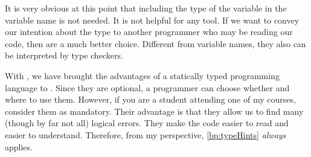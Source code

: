 It is very obvious at this point that including the type of the variable in the variable name is not needed.
It is not helpful for any tool.
If we want to convey our intention about the type to another programmer who may be reading our code, then  are a much better choice.
Different from variable names, they also can be interpreted by type checkers.

With , we have brought the advantages of a statically typed programming language to \python.
Since they are optional, a programmer can choose whether and where to use them.
However, if you are a student attending one of my courses, consider them as mandatory.
Their advantage is that they allow us to find many (though by far not all) logical errors.
They make the code easier to read and easier to understand.
Therefore, from my perspective, \cref{bp:typeHints} \emph{always} applies.

